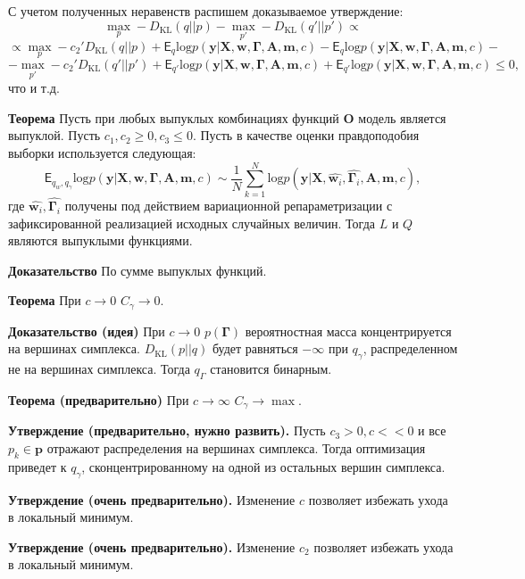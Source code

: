 \documentclass[12pt]{article}
\begin{document}
С учетом полученных неравенств распишем доказываемое утверждение:
\[
    \max_p -D_\text{KL}(q||p) - \max_{p'} -D_\text{KL}(q'||p') \propto 
\]
\[ \propto\max_p - c_2' D_\text{KL}(q||p) +\mathsf{E}_{q}\text{log} p(\mathbf{y}|\mathbf{X},\mathbf{w}, \boldsymbol{\Gamma}, \mathbf{A},\mathbf{m}, c) - \mathsf{E}_{q}\text{log} p(\mathbf{y}|\mathbf{X},\mathbf{w}, \boldsymbol{\Gamma}, \mathbf{A},\mathbf{m}, c) -
\]
\[  - \max_{p'} -c_2' D_\text{KL}(q'||p')  + \mathsf{E}_{q'}\text{log} p(\mathbf{y}|\mathbf{X},\mathbf{w}, \boldsymbol{\Gamma}, \mathbf{A},\mathbf{m}, c) +\mathsf{E}_{q'}\text{log} p(\mathbf{y}|\mathbf{X},\mathbf{w}, \boldsymbol{\Gamma}, \mathbf{A},\mathbf{m}, c)     \leq 0,  
\]
что и т.д.

\textbf{Теорема} Пусть при любых выпуклых комбинациях функций $\mathbf{O}$ модель является выпуклой. Пусть $c_1,c_2 \geq 0,  c_3 \leq 0$. Пусть в качестве оценки правдоподобия выборки используется следующая:
\[
    \mathsf{E}_{q_w,q_\gamma}\text{log} p(\mathbf{y}|\mathbf{X},\mathbf{w}, \boldsymbol{\Gamma}, \mathbf{A},\mathbf{m}, c) \sim \frac{1}{N}\sum_{k=1}^N \text{log} p(\mathbf{y}|\mathbf{X},\hat{\mathbf{w}_i}, \hat{\boldsymbol{\Gamma}_i}, \mathbf{A},\mathbf{m}, c),
\]  
где $\hat{\mathbf{w}_i}, \hat{\boldsymbol{\Gamma}_i}$ получены под действием вариационной репараметризации с зафиксированной реализацией исходных случайных величин. Тогда $L$ и $Q$ являются выпуклыми функциями.

\textbf{Доказательство} По сумме выпуклых функций.

 
\textbf{Теорема} При $c \to 0$ $C_\gamma \to 0$.

\textbf{Доказательство (идея)} При $c \to 0$ $p(\boldsymbol{\Gamma})$ вероятностная масса концентрируется на вершинах симплекса. $D_\text{KL} (p||q)$ будет равняться $-\infty$ при $q_\gamma$, распределенном не на вершинах симплекса. Тогда $q_\Gamma$ становится бинарным. 


\textbf{Теорема (предварительно)} При $c \to \infty$ $C_\gamma \to \max$.

\textbf{Утверждение (предварительно, нужно развить).} Пусть $c_3 > 0, c << 0$ и все $p_k \in \mathbf{p}$ отражают распределения на вершинах симплекса. Тогда оптимизация приведет к $q_\gamma$, сконцентрированному на одной из остальных вершин симплекса.

\textbf{Утверждение (очень предварительно).} Изменение $c$ позволяет избежать ухода в локальный минимум. 

\textbf{Утверждение (очень предварительно).} Изменение $c_2$ позволяет избежать ухода в локальный минимум.
\end{document}
